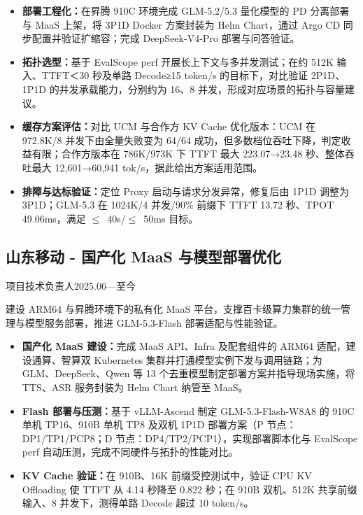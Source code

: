\documentclass{resume}
\newcommand{\entry}[3]{%
  \subsection*{#1}%
  {\small\color{resumegray}#2\hfill #3\par}\nopagebreak[4]
}
\begin{document}
\begin{itemize}

  \item \textbf{部署工程化：}在昇腾 910C 环境完成 GLM-5.2/5.3 量化模型的 PD 分离部署与 MaaS 上架，将 3P1D Docker 方案封装为 Helm Chart，通过 Argo CD 同步配置并验证扩缩容；完成 DeepSeek-V4-Pro 部署与问答验证。

  \item \textbf{拓扑选型：}基于 EvalScope perf 开展长上下文与多并发测试；在约 512K 输入、TTFT＜30 秒及单路 Decode≥15 token/s 的目标下，对比验证 2P1D、1P1D 的并发承载能力，分别约为 16、8 并发，形成对应场景的拓扑与容量建议。

  \item \textbf{缓存方案评估：}对比 UCM 与合作方 KV Cache 优化版本：UCM 在 972.8K/8 并发下由全量失败变为 64/64 成功，但多数档位吞吐下降，判定收益有限；合作方版本在 786K/973K 下 TTFT 最大 223.07→23.48 秒、整体吞吐最大 12,601→60,941 tok/s，据此给出方案适用范围。

  \item \textbf{排障与达标验证：}定位 Proxy 启动与请求分发异常，修复后由 1P1D 调整为 3P1D；GLM-5.3 在 1024K/4 并发/90\% 前缀下 TTFT 13.72 秒、TPOT 49.06ms，满足 $\leq$~40s/$\leq$~50ms 目标。

\end{itemize}

\newpage

\entry{山东移动 - 国产化 MaaS 与模型部署优化}{项目技术负责人}{2025.06—至今}

建设 ARM64 与昇腾环境下的私有化 MaaS 平台，支撑百卡级算力集群的统一管理与模型服务部署，推进 GLM-5.3-Flash 部署适配与性能验证。\par

\begin{itemize}

  \item \textbf{国产化 MaaS 建设：}完成 MaaS API、Infra 及配套组件的 ARM64 适配，建设通算、智算双 Kubernetes 集群并打通模型实例下发与调用链路；为 GLM、DeepSeek、Qwen 等 13 个去重模型制定部署方案并指导现场实施，将 TTS、ASR 服务封装为 Helm Chart 纳管至 MaaS。

  \item \textbf{Flash 部署与压测：}基于 vLLM-Ascend 制定 GLM-5.3-Flash-W8A8 的 910C 单机 TP16、910B 单机 TP8 及双机 1P1D 部署方案（P 节点：DP1/TP1/PCP8；D 节点：DP4/TP2/PCP1），实现部署脚本化与 EvalScope perf 自动压测，完成不同硬件与拓扑的性能对比。

  \item \textbf{KV Cache 验证：}在 910B、16K 前缀受控测试中，验证 CPU KV Offloading 使 TTFT 从 4.14 秒降至 0.822 秒；在 910B 双机、512K 共享前缀输入、8 并发下，测得单路 Decode 超过 10 token/s。

\end{itemize}
\end{document}
